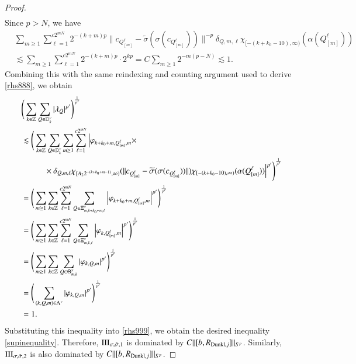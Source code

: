 \documentclass[12pt]{amsart}
\begin{document}
\begin{proof}
\begin{align*}
\end{align*}
Since $p>N$, we have
\begin{align*}
&\sum_{m\geq 1}\sum_{\ell=1}^{c2^{mN}}2^{-(k+m)p}\|c_{Q_{[m]}^\ell}-\widetilde{\sigma}(\sigma(c_{Q_{[m]}^\ell}))\|^{-p}\delta_{Q,m,\ell}\chi_{[-(k+k_0-10),\infty)}(\alpha(Q_{[m]}^\ell))\nonumber\\
&\lesssim\sum_{m\geq 1}\sum_{\ell=1}^{c2^{mN}}2^{-(k+m)p}\cdot 2^{kp}=C\sum_{m\geq 1}2^{-m(p-N)}\lesssim 1.
\end{align*}
Combining this with the same reindexing and counting argument used to derive \eqref{rhs888}, we obtain
\begin{align}\label{longdisplay}
&\Bigg(\sum_{k\in\mathbb{Z}}\sum_{Q\in\mathbb{D}_k^\nu}|\lambda_Q|^{p'}\Bigg)^{\frac{1}{p'}}\nonumber\\
&\lesssim \Bigg(\sum_{k\in\mathbb{Z}}\sum_{Q\in\mathbb{D}_k^\nu}\sum_{m\geq 1}\sum_{\ell=1}^{c2^{mN}}\Big|\varphi_{k+k_0+m,{Q_{[m]}^\ell},m}\times\nonumber\\
&\hspace{1.0cm}\times\delta_{Q,m,\ell}\chi_{[A_22^{-(k+k_0+m-1)},\infty)}(\|c_{Q_{[m]}^\ell}-\widetilde{\sigma}(\sigma(c_{Q_{[m]}^\ell}))\|) \chi_{[-(k+k_0-10),\infty)}(\alpha(Q_{[m]}^\ell))\Big|^{p'}\Bigg)^{\frac{1}{p'}}\nonumber\\
&=\Bigg(\sum_{m\geq 1}\sum_{k\in\mathbb{Z}}\sum_{\ell=1}^{c2^{mN}}\sum_{Q\in\Xi_{m,k+k_0+m,\ell}^\nu}\Big|\varphi_{k+k_0+m,{Q_{[m]}^\ell},m}\Big|^{p'}\Bigg)^{\frac{1}{p'}}\nonumber\\
&=\Bigg(\sum_{m\geq 1}\sum_{k\in\mathbb{Z}}\sum_{\ell=1}^{c2^{mN}}\sum_{Q\in\Xi_{m,k,\ell}^\nu}\Big|\varphi_{k,{Q_{[m]}^\ell},m}\Big|^{p'}\Bigg)^{\frac{1}{p'}}\nonumber\\
&=\Bigg(\sum_{m\geq 1}\sum_{k\in\mathbb{Z}}\sum_{Q\in \Theta_{m,k}^\nu}|\varphi_{k,Q,m}|^{p'}\Bigg)^{\frac{1}{p'}}\nonumber\\
&=\Bigg(\sum_{(k,Q,m)\in\Lambda^\nu}|\varphi_{k,Q,m}|^{p'}\Bigg)^{\frac{1}{p'}}\nonumber\\
&= 1.
\end{align}
Substituting this inequality into \eqref{rhs999}, we obtain the desired inequality \eqref{supinequality}. Therefore, ${\rm III}_{\sigma,\tilde{\sigma},1}$ is dominated by $C\|[b,R_{{\rm Dunkl},j}]\|_{S^p}$. Similarly,  ${\rm III}_{\sigma,\tilde{\sigma},2}$ is also dominated by $C\|[b,R_{{\rm Dunkl},j}]\|_{S^p}$.


\end{proof}
\end{document}
